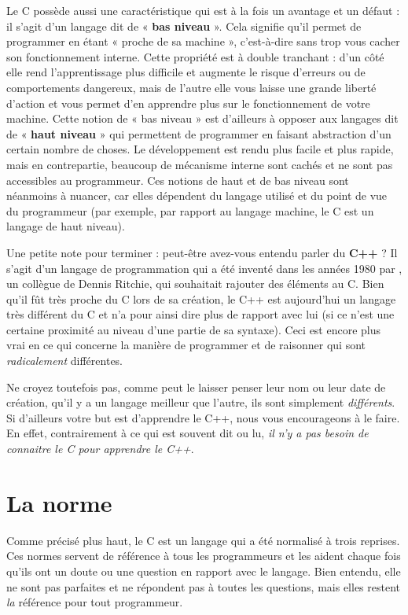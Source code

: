 Le C possède aussi une caractéristique qui est à la fois un avantage et
un défaut : il s'agit d'un langage dit de « \textbf{bas niveau} ». Cela
signifie qu'il permet de programmer en étant « proche de sa machine »,
c'est-à-dire sans trop vous cacher son fonctionnement interne. Cette
propriété est à double tranchant : d'un côté elle rend l'apprentissage
plus difficile et augmente le risque d'erreurs ou de comportements
dangereux, mais de l'autre elle vous laisse une grande liberté d'action
et vous permet d'en apprendre plus sur le fonctionnement de votre
machine. Cette notion de « bas niveau » est d'ailleurs à opposer aux
langages dit de « \textbf{haut niveau} » qui permettent de programmer en
faisant abstraction d'un certain nombre de choses. Le développement est
rendu plus facile et plus rapide, mais en contrepartie, beaucoup de
mécanisme interne sont cachés et ne sont pas accessibles au programmeur.
Ces notions de haut et de bas niveau sont néanmoins à nuancer, car elles
dépendent du langage utilisé et du point de vue du programmeur (par
exemple, par rapport au langage machine, le C est un langage de haut
niveau).

Une petite note pour terminer : peut-être avez-vous entendu parler du
\textbf{C++} ? Il s'agit d'un langage de programmation qui a été inventé
dans les années 1980 par
, un collègue de Dennis Ritchie, qui souhaitait rajouter des
éléments au C. Bien qu'il fût très proche du C lors de sa création, le
C++ est aujourd'hui un langage très différent du C et n'a pour ainsi
dire plus de rapport avec lui (si ce n'est une certaine proximité au
niveau d'une partie de sa syntaxe). Ceci est encore plus vrai en ce qui
concerne la manière de programmer et de raisonner qui sont
\emph{radicalement} différentes.

Ne croyez toutefois pas, comme peut le laisser penser leur nom ou leur
date de création, qu'il y a un langage meilleur que l'autre, ils sont
simplement \emph{différents}. Si d'ailleurs votre but est d'apprendre le
C++, nous vous encourageons à le faire. En effet, contrairement à ce qui
est souvent dit ou lu, \emph{il n'y a pas besoin de connaitre le C pour
apprendre le C++}.

\section{La norme}
\label{la-norme}

Comme précisé plus haut, le C est un langage qui a été normalisé à trois
reprises. Ces normes servent de référence à tous les programmeurs et les
aident chaque fois qu'ils ont un doute ou une question en rapport avec
le langage. Bien entendu, elle ne sont pas parfaites et ne répondent pas
à toutes les questions, mais elles restent \emph{la} référence pour tout
programmeur.

